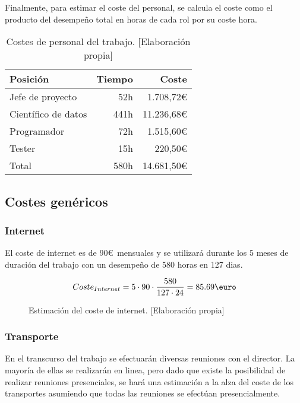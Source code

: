 Finalmente, para estimar el coste del personal, se calcula el coste como el producto del desempeño
total en horas de cada rol por su coste hora.

\begin{table}[ht]
    \begin{center}
        \begin{tabular}{ l r r }
         Posición & Tiempo & Coste \\
         \hline
         Jefe de proyecto & 52h & 1.708,72\euro \\
         Científico de datos & 441h & 11.236,68\euro \\
         Programador & 72h & 1.515,60\euro \\
         Tester & 15h & 220,50\euro \\
         \hline
         Total & 580h & 14.681,50\euro
        \end{tabular}
        \caption{Costes de personal del trabajo. [Elaboración propia]}\label{rolcosttable}
    \end{center}
\end{table}


\subsection{Costes genéricos}\label{costesgenericos}
\subsubsection{Internet} El coste de internet es de 90\euro\ mensuales y se utilizará durante los 5 meses de
duración del trabajo con un desempeño de 580 horas en 127 dias.
\begin{figure}[ht]
    \begin{align*}
        Coste_{Internet} = 5 \cdot 90 \cdot \frac{580}{127 \cdot 24} = 85.69\text{\euro}
    \end{align*}
    \caption{Estimación del coste de internet.  [Elaboración propia]}
\end{figure}

\subsubsection{Transporte} En el transcurso del trabajo se efectuarán diversas reuniones con el director. La mayoría de ellas
se realizarán en linea, pero dado que existe la posibilidad de realizar reuniones presenciales, se hará una estimación
a la alza del coste de los transportes asumiendo que todas las reuniones se efectúan presencialmente.

